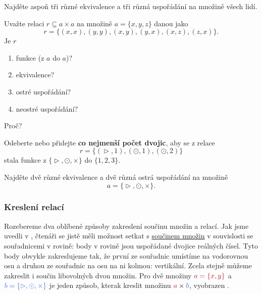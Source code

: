 \begin{exercise}
  Najděte aspoň tři různé ekvivalence a tři různá uspořádání na množině všech
  lidí.
\end{exercise}
\lessboxspace
\begin{exercise}
  Uvažte relaci $r \subseteq a \times a$ na množině $a = \{x, y, z\}$ danou jako
  \[
    r = \{(x, x), (y, y), (x, y), (y, x), (x, z), (z, x)\}.
  \]
  Je $r$
  \begin{enumerate}
    \item funkce (z $a$ do $a$)?
    \item ekvivalence?
    \item ostré uspořádání?
    \item neostré uspořádání?
  \end{enumerate}
  Proč?
\end{exercise}
\lessboxspace
\begin{exercise}
  Odeberte nebo přidejte \textbf{co nejmenší počet dvojic}, aby se z relace
  \[
    r = \{(\vartriangleright, 1), (\odot, 1), (\odot, 2)\}
  \]
  stala funkce z $\{\vartriangleright, \odot, \times\}$ do $\{1, 2, 3\}$.
\end{exercise}
\lessboxspace
\begin{exercise}
  Najděte dvě různé ekvivalence a dvě různá ostrá uspořádání na množině
  \[
    a = \{\vartriangleright, \odot, \times\}.
  \]
\end{exercise}

\subsubsection{Kreslení relací}
\label{sssec:kresleni-relaci}

Rozebereme dva oblíbené způsoby zakreslení součinu množin a relací. Jak jsme
uvedli v , čtenáři se jistě měli
možnost setkat s \hyperref[def:soucin-mnozin]{součinem množin} v souvislosti se
souřadnicemi v rovině: body v rovině jsou uspořádané dvojice reálných čísel.
Tyto body obvykle zakreslujeme tak, že první ze souřadnic umístíme na vodorovnou
osu a druhou ze souřadnic na osu na ni kolmou: vertikální. Zcela stejně můžeme
zakreslit i součin libovolných dvou množin. Pro dvě množiny $\clr{a = \{x, y\}}$
a $\clb{b = \{\vartriangleright, \odot, \times\}}$ je jeden způsob, kterak
kreslit množinu $\clr{a} \times \clb{b}$, vyobrazen
.

